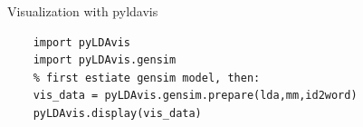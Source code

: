 \documentclass{beamer}
\begin{document}
\begin{frame}[plain]
\end{frame}




\begin{frame}[fragile]{Visualization with pyldavis}
	\begin{lstlisting}
	import pyLDAvis
	import pyLDAvis.gensim
	% first estiate gensim model, then:
	vis_data = pyLDAvis.gensim.prepare(lda,mm,id2word)
	pyLDAvis.display(vis_data)
	\end{lstlisting}
\end{frame}
\end{document}
